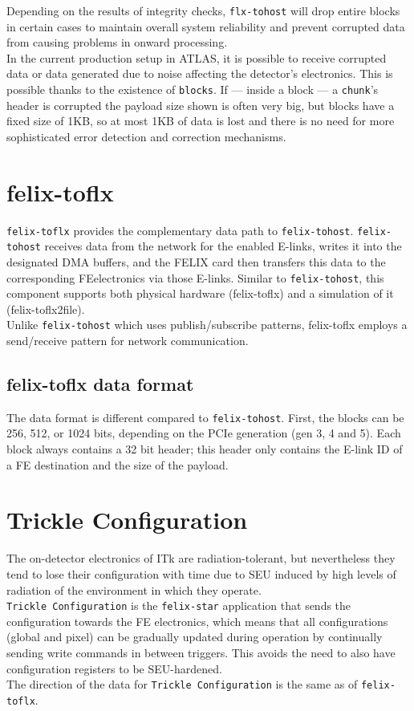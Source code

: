 Depending on the results of integrity checks, \texttt{flx-tohost} will drop entire blocks in certain cases to maintain overall system reliability and prevent corrupted data from causing problems in onward processing.\\
In the current production setup in \acs{ATLAS}, it is possible to receive corrupted data or data generated due to noise affecting the detector's electronics.
This is possible thanks to the existence of \texttt{blocks}. If --- inside a block --- a \texttt{chunk}'s header is corrupted the payload size shown is often very big, but blocks have a fixed size of 1KB, so at most 1KB of data is lost and there is no need for more sophisticated error detection and correction mechanisms.

\section{felix-toflx}
\label{sec:felix_toflx}
\texttt{felix-toflx} provides the complementary data path to \texttt{felix-tohost}. \texttt{felix-tohost} receives data from the network for the enabled \acs{E-link}s, writes it into the designated \acs{DMA} buffers, and the \acs{FELIX} card then transfers this data to the corresponding \acl{FE}electronics via those \acs{E-link}s.
Similar to \texttt{felix-tohost}, this component supports both physical hardware (felix-toflx) and a simulation of it (felix-toflx2file).\\
Unlike \texttt{felix-tohost} which uses publish/subscribe patterns, felix-toflx employs a send/receive pattern for network communication.

\subsection{felix-toflx data format}

The data format is different compared to \texttt{felix-tohost}. First, the blocks can be 256, 512, or 1024 bits, depending on the \acs{PCIe} generation (gen 3, 4 and 5). Each block always contains a 32 bit header; this header only contains the \acs{E-link} ID of a \acl{FE} destination and the size of the payload.

\section{Trickle Configuration}

The on-detector electronics of \acf{ITk} are radiation-tolerant, but nevertheless they tend to lose their configuration with time due to \acl{SEU} induced by high levels of radiation \cite{buschmann2019itk} of the environment in which they operate.\\
\texttt{Trickle Configuration} is the \texttt{felix-star} application that sends the configuration towards the \acl{FE} electronics, which means that all configurations (global and pixel) can be gradually updated during operation by continually sending write commands in between triggers. This avoids the need to also have configuration registers to be \acs{SEU}-hardened.\\
The direction of the data for \texttt{Trickle Configuration} is the same as of \texttt{felix-toflx}.

